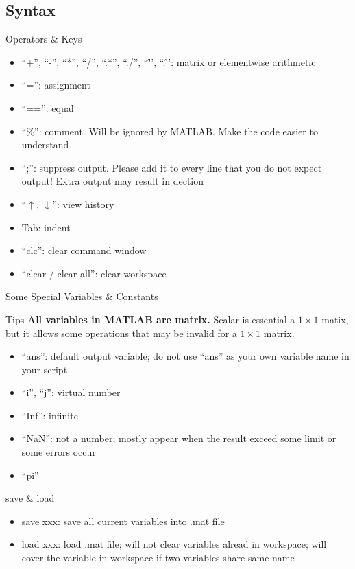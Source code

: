 \documentclass{beamer}
\begin{document}
\subsection{Syntax}
\begin{frame}{Operators \& Keys}
\begin{itemize}
\item ``+'', ``-'', ``*'', ``/'', ``.*'', ``./'', ``\^'', ``.\^'': matrix or elementwise arithmetic
\item ``='': assignment
\item ``=='': equal
\item ``\%'': comment. Will be ignored by MATLAB. Make the code easier to understand
\item ``;'': suppress output. Please add it to every line that you do not expect output! Extra output may result in dection
\item ``$\uparrow$, $\downarrow$'': view history
\item Tab: indent
\item ``clc'': clear command window
\item ``clear / clear all'': clear workspace
\end{itemize}
\end{frame}

\begin{frame}{Some Special Variables \& Constants}
\begin{block}{Tips}
\textbf{All variables in MATLAB are matrix.} Scalar is essential a $1\times1$ matix, but it allows some operations that may be invalid for a $1\times1$ matrix.
\end{block}
\begin{itemize}
\item ``ans'': default output variable; do not use ``ans'' as your own variable name in your script
\item ``i'', ``j'': virtual number
\item ``Inf'': infinite
\item ``NaN'': not a number; mostly appear when the result exceed some limit or some errors occur
\item ``pi''
\end{itemize}

\begin{block}{save \& load}
\begin{itemize}
\item save xxx: save all current variables into .mat file
\item load xxx: load .mat file; will not clear variables alread in workspace; will cover the variable in workspace if two variables share same name
\end{itemize}
\end{block}
\end{frame}
\end{document}
